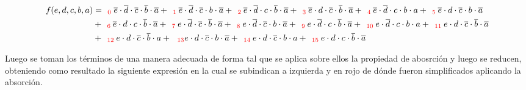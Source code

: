 \begin{equation*}
\begin{align*}
f(e,d,c,b,a) & =  _{\ \ \color{red} 0} {\overline{e} \cdot \overline{d} \cdot \overline{c} \cdot \overline{b} \cdot \overline{a}}
+ _{\ \ \color{red} 1} {\overline{e} \cdot \overline{d} \cdot \overline{c} \cdot b \cdot \overline{a}} 
+ _{\ \ \color{red} 2} {\overline{e} \cdot \overline{d}  \cdot c \cdot \overline{b} \cdot \overline{a}}  
+ _{\ \ \color{red} 3} {\overline{e} \cdot d \cdot \overline{c} \cdot \overline{b} \cdot \overline{a}} 
+ _{\ \ \color{red} 4} {\overline{e} \cdot \overline{d} \cdot c \cdot b \cdot a}
+ _{\ \ \color{red} 5} {\overline{e} \cdot d \cdot \overline{c} \cdot b \cdot \overline{a}}  \\
& + _{\ \ \color{red} 6} {\overline{e} \cdot d \cdot c \cdot \overline{b} \cdot \overline{a}}
+ _{\ \ \color{red} 7} {e \cdot \overline{d} \cdot \overline{c} \cdot \overline{b} \cdot \overline{a}} 
+ _{\ \ \color{red} 8} {e \cdot \overline{d} \cdot \overline{c} \cdot b \cdot \overline{a}}
+ _{\ \ \color{red} 9} {e \cdot \overline{d} \cdot c \cdot \overline{b} \cdot \overline{a}}
+ _{\ \ \color{red} 10} {e \cdot \overline{d} \cdot c \cdot b \cdot a}
+ _{\ \ \color{red} 11} {e \cdot d \cdot \overline{c} \cdot \overline{b} \cdot \overline{a}} \\
& + _{\ \ \color{red} 12} {e \cdot d \cdot \overline{c} \cdot \overline{b} \cdot a} 
+ {_{\ \ \color{red} 13} e \cdot d \cdot \overline{c} \cdot b \cdot \overline{a}} 
+ _{\ \ \color{red} 14} {e \cdot d \cdot \overline{c} \cdot b \cdot a}
+ _{\ \ \color{red} 15} {e \cdot d \cdot c \cdot \overline{b} \cdot \overline{a}}
\end{align*}
\end{equation*}

Luego se toman los t\'erminos de una manera adecuada de forma tal que se aplica sobre ellos la propiedad de abosrci\'on 
y luego se reducen, obteniendo como resultado la siguiente expresi\'on en la cual se subindican a izquierda y en rojo de d\'onde
fueron simplificados aplicando la absorci\'on.

